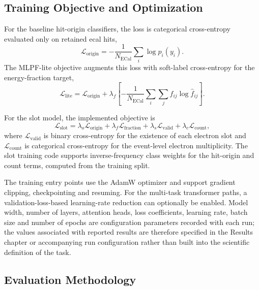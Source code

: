 \subsection{Training Objective and Optimization}
\label{sec:method_training}

For the baseline hit-origin classifiers, the loss is categorical
cross-entropy evaluated only on retained \gls{ecal} hits,
\begin{equation}
    \mathcal{L}_{\mathrm{origin}}
    =
    -\frac{1}{N_{\mathrm{ECal}}}
    \sum_i \log p_i(y_i).
\end{equation}
The MLPF-lite objective augments this loss with soft-label
cross-entropy for the energy-fraction target,
\begin{equation}
    \mathcal{L}_{\mathrm{lite}}
    =
    \mathcal{L}_{\mathrm{origin}}
    + \lambda_f
    \left[
    -\frac{1}{N_{\mathrm{ECal}}}
    \sum_i \sum_j f_{ij}\log \widehat{f}_{ij}
    \right].
\end{equation}

For the slot model, the implemented objective is
\begin{equation}
    \mathcal{L}_{\mathrm{slot}}
    =
    \lambda_o\mathcal{L}_{\mathrm{origin}}
    +\lambda_f\mathcal{L}_{\mathrm{fraction}}
    +\lambda_s\mathcal{L}_{\mathrm{valid}}
    +\lambda_c\mathcal{L}_{\mathrm{count}},
\end{equation}
where \(\mathcal{L}_{\mathrm{valid}}\) is binary cross-entropy for the
existence of each electron slot and
\(\mathcal{L}_{\mathrm{count}}\) is categorical cross-entropy for the
event-level electron multiplicity. The slot training code supports
inverse-frequency class weights for the hit-origin and count terms, computed
from the training split.

The training entry points use the AdamW optimizer and support gradient
clipping, checkpointing and resuming. For the multi-task transformer paths,
a validation-loss-based learning-rate reduction can optionally be enabled.
Model width, number of layers, attention heads, loss coefficients, learning
rate, batch size and number of epochs are configuration parameters recorded
with each run; the values associated with reported results are therefore
specified in the Results chapter or accompanying run configuration rather
than built into the scientific definition of the task.

\subsection{Evaluation Methodology}
\label{sec:method_evaluation}

